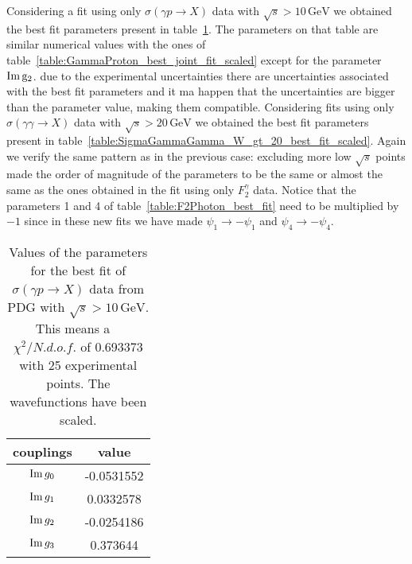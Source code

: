 \documentclass[preprint, 12pt]{elsarticle}
\begin{document}
Considering a fit using only $\sigma\left(\gamma p \rightarrow X\right)$ data with $\sqrt{s} > 10 \, \text{GeV}$ we obtained the best fit parameters present in table~\ref{table:SigmaGammaProton_W_gt_10_best_fit_scaled}. The parameters on that table are similar numerical values with the ones of table~\ref{table:GammaProton_best_joint_fit_scaled} except for the parameter $\rm{Im} \, g_2$. due to the experimental uncertainties there are uncertainties associated with the best fit parameters and it ma happen that the uncertainties are bigger than the parameter value, making them compatible. Considering fits using only $\sigma\left(\gamma \gamma \rightarrow X\right)$ data with $\sqrt{s} > 20 \, \text{GeV}$ we obtained the best fit parameters present in table~\ref{table:SigmaGammaGamma_W_gt_20_best_fit_scaled}. Again we verify the same pattern as in the previous case: excluding more low $\sqrt{s}$ points made the order of magnitude of the parameters to be the same or almost the same as the ones obtained in the fit using only $F_2^\gamma$ data. Notice that the parameters 1 and 4 of table~\ref{table:F2Photon_best_fit} need to be multiplied by $-1$ since in these new fits we have made $\psi_1\rightarrow -\psi_1$ and $\psi_4\rightarrow -\psi_4$.

\begin{table}[b!]
\centering
\caption{Values of the parameters for the best fit of $\sigma\left(\gamma p \rightarrow X\right)$ data from PDG with $\sqrt{s} > 10 \, \text{GeV}$. This means a ~$\chi^2 / {N.d.o.f.}$ of 0.693373 with 25 experimental points. The wavefunctions have been scaled.}
\vspace{0.5cm}
\begin{tabular}{|c|c|}
\hline
couplings   & value \\
\hline
${\rm Im} \, g_0$  & -0.0531552\\ 
\hline
${\rm Im} \, g_1$  & 0.0332578 \\ 
\hline
${\rm Im} \, g_2$  & -0.0254186 \\
\hline
${\rm Im} \, g_3$  & 0.373644 \\ 
\hline
\end{tabular}
\label{table:SigmaGammaProton_W_gt_10_best_fit_scaled}
\end{table}
\end{document}
